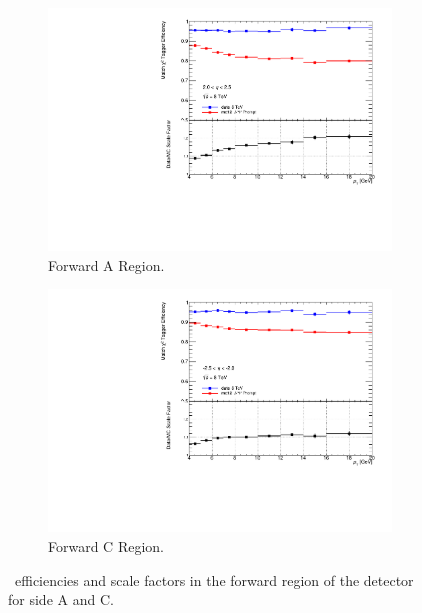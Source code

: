 \begin{figure}[htbp]
  \centering
  \begin{subfigure}[b]{0.85\textwidth}
    \includegraphics[width=\textwidth]{PartCalibration2012/Plots/SFPlots/Forward_A_smt.pdf}
    \caption{Forward A Region.} \label{fig:CalibrationScaleFactorForwardA}
  \end{subfigure}
  
  \begin{subfigure}[b]{0.85\textwidth}
    \includegraphics[width=\textwidth]{PartCalibration2012/Plots/SFPlots/Forward_C_smt.pdf}
    \caption{Forward C Region.} \label{fig:CalibrationScaleFactorForwardC}
  \end{subfigure}
  \caption{\xsm\ efficiencies and scale factors in the forward region of the detector for side  A and  C.} \label{fig:CalibrationScaleFactorForward}
\end{figure}

